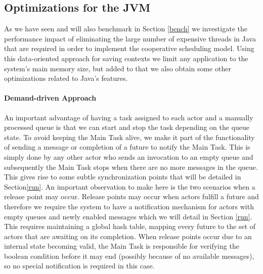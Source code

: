 \subsection{Optimizations for the JVM}
\label{optimizations}
As we have seen and will also benchmark in Section \ref{bench} we investigate the performance impact of eliminating the large number of expensive threads in Java that are required in order to implement the cooperative scheduling model. Using this data-oriented approach for saving contexts we limit any application to the system's main memory size, but added to that we also obtain some other optimizations related to Java's features.

\paragraph{Demand-driven Approach}
An important advantage of having a task assigned to each actor and a manually processed queue is that we can start and stop the task depending on the queue state. To avoid keeping the Main Task alive, we make it part of the functionality of sending a message or completion of a future to notify the Main Task. This is simply done by any other actor who sends an invocation to an empty queue and subsequently the Main Task stops when there are no more messages in the queue. This gives rise to some subtle synchronization points that will be detailed in Section\ref{run}. An important observation to make here is the two scenarios when a release point may occur. Release points may occur when actors fulfill a future and therefore we require the system to have a notification mechanism for actors with empty queues and newly enabled messages which we will detail in Section \ref{run}. This requires maintaining a global hash table, mapping every future to the set of actors that are awaiting on its completion. When release points occur due to an internal state becoming valid, the Main Task is responsible for verifying the boolean condition before it may end (possibly because of no available messages), so no special notification is required in this case.



